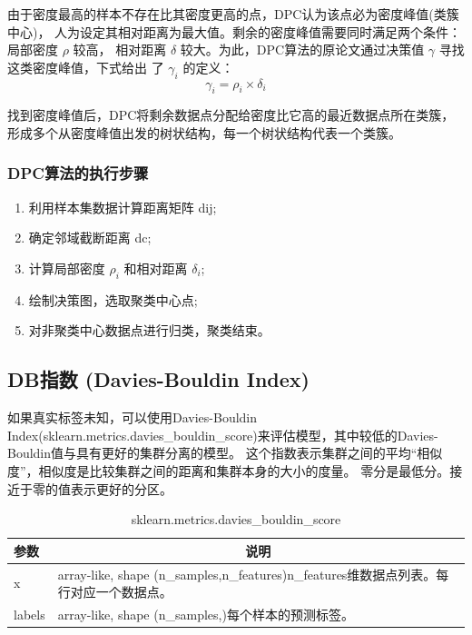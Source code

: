\documentclass[UTF8,a4paper,AutoFakeBold,AutoFakeSlant]{article}
\begin{document}
由于密度最高的样本不存在比其密度更高的点，DPC认为该点必为密度峰值(类簇中心)，
人为设定其相对距离为最大值。剩余的密度峰值需要同时满足两个条件：局部密度 $\rho$ 较高，
相对距离 $\delta$ 较大。为此，DPC算法的原论文通过决策值 $\gamma$ 寻找这类密度峰值，下式给出
了 $\gamma_i$ 的定义：
$$ \gamma_i = \rho_i \times \delta_i $$

找到密度峰值后，DPC将剩余数据点分配给密度比它高的最近数据点所在类簇，形成多个从密度峰值出发的树状结构，每一个树状结构代表一个类簇。


\subsubsection{DPC算法的执行步骤}

\begin{enumerate}
  \item 利用样本集数据计算距离矩阵 dij;
  \item 确定邻域截断距离 dc;
  \item 计算局部密度 $\rho_i$ 和相对距离 $\delta_i$;
  \item 绘制决策图，选取聚类中心点;
  \item 对非聚类中心数据点进行归类，聚类结束。
\end{enumerate}

\subsection{DB指数 (Davies-Bouldin Index)}

如果真实标签未知，可以使用Davies-Bouldin Index(sklearn.metrics.davies\_bouldin\_score)来评估模型，其中较低的Davies-Bouldin值与具有更好的集群分离的模型。
这个指数表示集群之间的平均“相似度”，相似度是比较集群之间的距离和集群本身的大小的度量。
零分是最低分。接近于零的值表示更好的分区。

\begin{table}[htbp]
  \centering
    \begin{tabular}{|l|p{15.61em}|l|}
    \toprule
    参数    & \multicolumn{2}{c|}{说明} \\
    \midrule
    x     & \multicolumn{2}{p{25.22em}|}{array-like, shape (n\_samples,n\_features)\newline{}n\_features维数据点列表。每行对应一个数据点。} \\
    \midrule
    labels & \multicolumn{2}{p{25.22em}|}{array-like, shape (n\_samples,)\newline{}每个样本的预测标签。} \\
    \bottomrule
    \end{tabular}%
  \caption{sklearn.metrics.davies\_bouldin\_score}
  \label{tab:addlabel}%
\end{table}%
\end{document}
